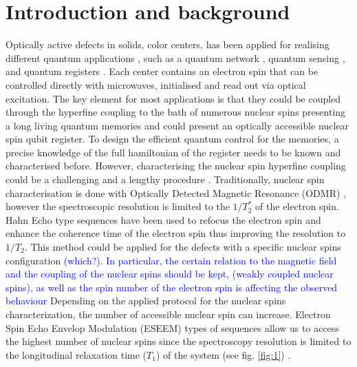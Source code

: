 \documentclass[%
 reprint,
superscriptaddress,
 amsmath,amssymb,
 aps,
]{revtex4-2}
\newcommand{\vvv}[1]{\textcolor{blue}{#1}}
\begin{document}
\maketitle
\section{Introduction and background}
Optically active defects in solids, color centers, has been applied for realising different quantum applications \cite{awschalom2018quantum}, such as a quantum network \cite{pompili2021realization}, quantum sensing \cite{degen2017quantum}, and quantum registers \cite{bradley2019ten}. 
Each center contains an electron spin that can be controlled directly with microwaves, initialised and read out via optical excitation. 
The key element for most applications is that they could be coupled through the hyperfine coupling to the bath of numerous nuclear spins presenting a long living quantum memories and could present an optically accessible nuclear spin qubit register. 
To design the efficient quantum control for the memories, a precise knowledge of the full hamiltonian of the register needs to be known and characterised before. 
However, characterising the nuclear spin hyperfine coupling could be a challenging and a lengthy procedure \cite{taminuau27, taminiau50}. 
Traditionally, nuclear spin characterisation is done with Optically Detected Magnetic Resonance (ODMR) \cite{Dreau, Neumann, Eriks}, however the spectroscopic resolution is limited to the $1/T_2^\ast$ of the electron spin. 
Hahn Echo type sequences have been used to refocus the electron spin and enhance the coherence time of the electron spin \cite{childress2006coherent} thus improving the resolution to $1/T_2$. 
This method could be applied for the defects with a specific nuclear spins configuration \vvv{(which?)}. 
\vvv{In particular, the certain relation to the magnetic field and the coupling of the nuclear spins should be kept, (weakly coupled nuclear spins), as well as the spin number of the electron spin is affecting the observed behaviour}
Depending on the applied protocol for the nuclear spins characterization, the number of accessible nuclear spin can increase. Electron Spin Echo Envelop Modulation (ESEEM) types of sequences allow us to access the highest number of nuclear spins since the spectroscopy resolution is limited to the longitudinal relaxation time ($T_1$) of the system (see fig. \ref{fig:1}) \cite{Laraui, Vorobyov}. 
\end{document}
